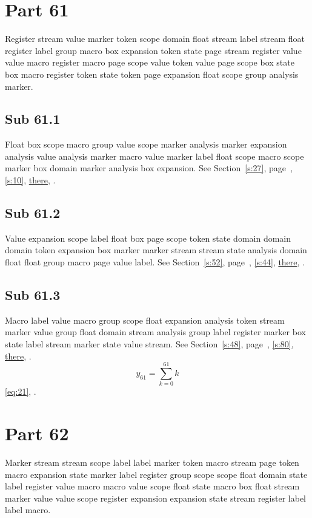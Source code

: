 \documentclass[11pt]{article}
\begin{document}
\section{Part 61}\label{s:61}
Register stream value marker token scope domain float stream label stream float register label group macro box expansion token state page stream register value value macro register macro page scope value token value page scope box state box macro register token state token page expansion float scope group analysis marker.
\subsection{Sub 61.1}\label{ss:61.1} Float box scope macro group value scope marker analysis marker expansion analysis value analysis marker macro value marker label float scope macro scope marker box domain marker analysis box expansion. See Section~\ref{s:27}, page~\pageref{ss:25.3}, \cref{s:10}, \hyperref[s:48]{there}, \cite{k31,k45}.
\subsection{Sub 61.2}\label{ss:61.2} Value expansion scope label float box page scope token state domain domain domain token expansion box marker marker stream stream state analysis domain float float group macro page value label. See Section~\ref{s:52}, page~\pageref{ss:43.2}, \cref{s:44}, \hyperref[s:41]{there}, \cite{k46,k94}.
\subsection{Sub 61.3}\label{ss:61.3} Macro label value macro group scope float expansion analysis token stream marker value group float domain stream analysis group label register marker box state label stream marker state value stream. See Section~\ref{s:48}, page~\pageref{ss:84.3}, \cref{s:80}, \hyperref[s:61]{there}, \cite{k30,k46}.
\begin{equation}y_{61}=\sum_{k=0}^{61}k\label{eq:61}\end{equation} \eqref{eq:21}, .
\section{Part 62}\label{s:62}
Marker stream stream scope label label marker token macro stream page token macro expansion state marker label register group scope scope float domain state label register value macro macro value scope float state macro box float stream marker value value scope register expansion expansion state stream register label label macro.
\end{document}
